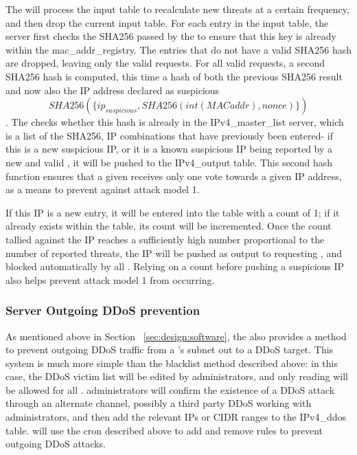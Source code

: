 The \servname will process the input table to recalculate new threats at a certain frequency, and then drop the current input table. For each entry in the input table, the server first checks the SHA256 passed by the \nodename to ensure that this key is already within the mac_addr_registry. The entries that do not have a valid SHA256 hash are dropped, leaving only the valid requests. For all valid requests, a second SHA256 hash is computed, this time a hash of both the previous SHA256 result and now also the IP address declared as suspicious \[SHA256(\{ip_{suspicious}, SHA256(int(MAC addr), nonce)\}) \]. The \servname checks whether this hash is already in the IPv4_master_list server, which is a list of the SHA256, IP combinations that have previously been entered- if this is a new suspicious IP, or it is a known suspicious IP being reported by a new and valid \nodename, it will be pushed to the IPv4_output table. This second hash function ensures that a given \servname receives only one vote towards a given IP address, as a means to prevent against attack model 1. 

If this IP is a new entry, it will be entered into the table with a count of 1; if it already exists within the table, its count will be incremented. Once the count tallied against the IP reaches a sufficiently high number proportional to the number of reported threats, the IP will be pushed as output to requesting \nodenames, and blocked automatically by all \nodenames. Relying on a count before pushing a suspicious IP also helps prevent attack model 1 from occurring. 

\subsubsection{Server Outgoing DDoS prevention}
\label{sec:design:serverddos}

As mentioned above in Section ~\ref{sec:design:software}, the \servname also provides a method to prevent outgoing DDoS traffic from a \nodename's subnet out to a DDoS target. This system is much more simple than the blacklist method described above: in this case, the DDoS victim list will be edited by \sysname administrators, and only reading will be allowed for all \nodenames. \sysname administrators will confirm the existence of a DDoS attack through an alternate channel, possibly a third party DDoS \cite{DDoSPreventionTools} working with \sysname administrators, and then add the relevant IPs or CIDR ranges to the IPv4_ddos table. \nodenames will use the cron described above to add and remove rules to prevent outgoing DDoS attacks.
